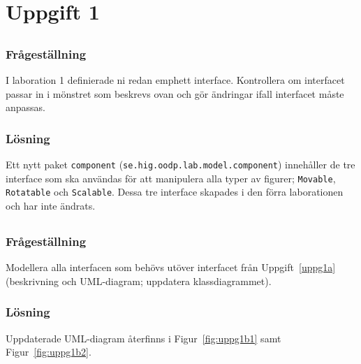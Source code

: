 %
%

\section{Uppgift 1}\label{sec:uppg1}

\subsection{}\label{sec:uppg1a}
\subsubsection*{Frågeställning}
I laboration 1 definierade ni redan emph{ett} interface. Kontrollera om
interfacet passar in i mönstret som beskrevs ovan och gör ändringar ifall
interfacet måste anpassas.

\subsubsection*{Lösning}
Ett nytt paket \texttt{component} (\texttt{se.hig.oodp.lab.model.component})
innehåller de tre interface som ska användas för att manipulera alla typer av
figurer; \texttt{Movable}, \texttt{Rotatable} och \texttt{Scalable}.
Dessa tre interface skapades i den förra laborationen och har inte ändrats.


\subsection{}\label{sec:uppg1b}
\subsubsection*{Frågeställning}
Modellera alla interfacen som behövs utöver interfacet från
Uppgift~\ref{uppg1a} (beskrivning och UML-diagram; uppdatera klassdiagrammet).

\subsubsection*{Lösning}
Uppdaterade UML-diagram återfinns i Figur~\ref{fig:uppg1b1} samt
Figur~\ref{fig:uppg1b2}.

